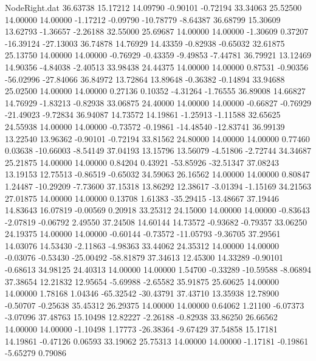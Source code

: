 \begin{filecontents}{NodeRight.dat}
  36.63738   15.17212   14.09790    -0.90101   -0.72194   33.34063   25.52500   14.00000   14.00000   -1.17212   -0.09790  -10.78779   -8.64387
  36.68799   15.30609   13.62793    -1.36657   -2.26188   32.55000   25.69687   14.00000   14.00000   -1.30609    0.37207  -16.39124  -27.13003
  36.74878   14.76929   14.43359    -0.82938   -0.65032   32.61875   25.13750   14.00000   14.00000   -0.76929   -0.43359   -9.49853   -7.44781
  36.79921   13.12469   14.90356    -4.84038   -2.40513   33.98438   24.44375   14.00000   14.00000    0.87531   -0.90356  -56.02996  -27.84066
  36.84972   13.72864   13.89648    -0.36382   -0.14894   33.94688   25.02500   14.00000   14.00000    0.27136    0.10352   -4.31264   -1.76555
  36.89008   14.66827   14.76929    -1.83213   -0.82938   33.06875   24.40000   14.00000   14.00000   -0.66827   -0.76929  -21.49023   -9.72834
  36.94087   14.73572   14.19861    -1.25913   -1.11588   32.65625   24.55938   14.00000   14.00000   -0.73572   -0.19861  -14.48540  -12.83741
  36.99139   13.22540   13.96362    -0.90101   -0.72194   33.81562   24.80000   14.00000   14.00000    0.77460    0.03638  -10.66003   -8.54149
  37.04193   13.15796   13.56079    -4.51806   -2.72744   34.34687   25.21875   14.00000   14.00000    0.84204    0.43921  -53.85926  -32.51347
  37.08243   13.19153   12.75513    -0.86519   -0.65032   34.59063   26.16562   14.00000   14.00000    0.80847    1.24487  -10.29209   -7.73600
  37.15318   13.86292   12.38617    -3.01394   -1.15169   34.21563   27.01875   14.00000   14.00000    0.13708    1.61383  -35.29415  -13.48667
  37.19446   14.83643   16.07819    -0.00569    0.20918   33.25312   24.15000   14.00000   14.00000   -0.83643   -2.07819   -0.06792    2.49550
  37.24508   14.60144   14.73572    -0.93682   -0.79357   33.06250   24.19375   14.00000   14.00000   -0.60144   -0.73572  -11.05793   -9.36705
  37.29561   14.03076   14.53430    -2.11863   -4.98363   33.44062   24.35312   14.00000   14.00000   -0.03076   -0.53430  -25.00492  -58.81879
  37.34613   12.45300   14.33289    -0.90101   -0.68613   34.98125   24.40313   14.00000   14.00000    1.54700   -0.33289  -10.59588   -8.06894
  37.38654   12.21832   12.95654    -5.69988   -2.65582   35.91875   25.60625   14.00000   14.00000    1.78168    1.04346  -65.32542  -30.43791
  37.43710   13.35938   12.78900    -0.50707   -0.25638   35.45312   26.29375   14.00000   14.00000    0.64062    1.21100   -6.07373   -3.07096
  37.48763   15.10498   12.82227    -2.26188   -0.82938   33.86250   26.66562   14.00000   14.00000   -1.10498    1.17773  -26.38364   -9.67429
  37.54858   15.17181   14.19861    -0.47126    0.06593   33.19062   25.75313   14.00000   14.00000   -1.17181   -0.19861   -5.65279    0.79086

\end{filecontents}
